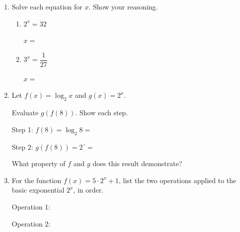 \documentclass[10pt]{article}
\begin{document}
\namedateperiod

\vspace{0.15in}

\begin{enumerate}[leftmargin=1.8em, itemsep=16pt]

\item Solve each equation for $x$. Show your reasoning.

\vspace{6pt}
\begin{enumerate}[leftmargin=1.5em, itemsep=10pt, label=\alph*.]
  \item $2^x = 32$

  \vspace{6pt}
  $x = $ \blank{3cm}

  \item $3^x = \dfrac{1}{27}$

  \vspace{6pt}
  $x = $ \blank{3cm}
\end{enumerate}

\item Let $f(x) = \log_2 x$ and $g(x) = 2^x$.

\vspace{6pt}
Evaluate $g(f(8))$. Show each step.

\vspace{6pt}
Step 1: $f(8) = \log_2 8 = $ \blank{2.5cm}

\vspace{6pt}
Step 2: $g(f(8)) = 2^{\,\square} = $ \blank{2.5cm}

\vspace{8pt}
What property of $f$ and $g$ does this result demonstrate?

\writeline

\item For the function $f(x) = 5 \cdot 2^x + 1$, list the two operations applied to the
      basic exponential $2^x$, in order.

\vspace{6pt}
Operation 1: \blank{6cm}

\vspace{6pt}
Operation 2: \blank{6cm}

\end{enumerate}
\end{document}
